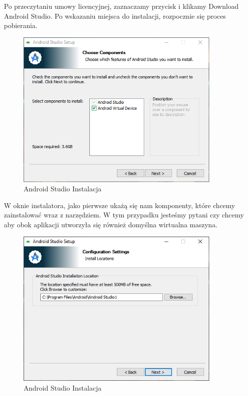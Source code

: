 Po przeczytaniu umowy licencyjnej, zaznaczamy przycisk i klikamy Download Android Studio. Po wskazaniu miejsca do instalacji, rozpocznie się proces pobierania.
\newpage
\begin{figure}[!hbt]
	\begin{center}
		\includegraphics[width=10cm]{rys/InsAndr/1.png}
		\caption{Android Studio Instalacja}
		\label{rys:Android-studio-instalacja1}
	\end{center}
\end{figure}
W oknie instalatora, jako pierwsze ukażą się nam komponenty, które chcemy zainstalować wraz z narzędziem. W tym przypadku jesteśmy pytani czy chcemy aby obok aplikacji utworzyła się również domyślna wirtualna maszyna.

\begin{figure}[!hbt]
	\begin{center}
		\includegraphics[width=10cm]{rys/InsAndr/2.png}
		\caption{Android Studio Instalacja}
		\label{rys:Android-studio-instalacja2}
	\end{center}
\end{figure}

